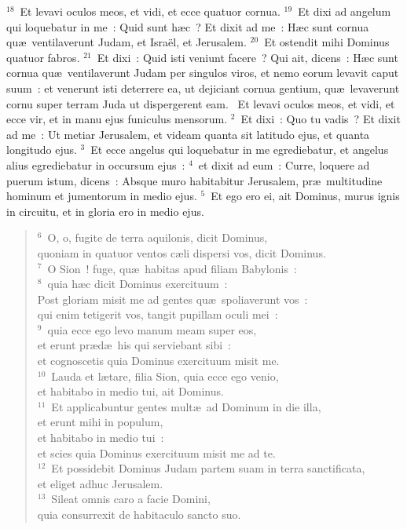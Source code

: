 ${}^{18}$~Et levavi oculos meos, et vidi, et ecce quatuor cornua.
${}^{19}$~Et dixi ad angelum qui loquebatur in me~: Quid sunt h\ae c~? Et dixit ad me~: H\ae c sunt cornua qu\ae\ ventilaverunt Judam, et Isra\"el, et Jerusalem.
${}^{20}$~Et ostendit mihi Dominus quatuor fabros.
${}^{21}$~Et dixi~: Quid isti veniunt facere~? Qui ait, dicens~: H\ae c sunt cornua qu\ae\ ventilaverunt Judam per singulos viros, et nemo eorum levavit caput suum~: et venerunt isti deterrere ea, ut dejiciant cornua gentium, qu\ae\ levaverunt cornu super terram Juda ut dispergerent eam.
~\lettrine[lines=10,image=true,loversize=0.05,lraise=-0.03]{E}{}t levavi oculos meos, et vidi, et ecce vir, et in manu ejus funiculus mensorum.
${}^{2}$~Et dixi~: Quo tu vadis~? Et dixit ad me~: Ut metiar Jerusalem, et videam quanta sit latitudo ejus, et quanta longitudo ejus.
${}^{3}$~Et ecce angelus qui loquebatur in me egrediebatur, et angelus alius egrediebatur in occursum ejus~:
${}^{4}$~et dixit ad eum~: Curre, loquere ad puerum istum, dicens~: Absque muro habitabitur Jerusalem, pr\ae\ multitudine hominum et jumentorum in medio ejus.
${}^{5}$~Et ego ero ei, ait Dominus, murus ignis in circuitu, et in gloria ero in medio ejus.
\begin{flushleft}\begin{verse}${}^{6}$~O, o, fugite de terra aquilonis, dicit Dominus,\\ quoniam in quatuor ventos c\ae li dispersi vos, dicit Dominus.\\
${}^{7}$~O Sion~! fuge, qu\ae\ habitas apud filiam Babylonis~:\\
${}^{8}$~quia h\ae c dicit Dominus exercituum~:\\ Post gloriam misit me ad gentes qu\ae\ spoliaverunt vos~:\\ qui enim tetigerit vos, tangit pupillam oculi mei~:\\
${}^{9}$~quia ecce ego levo manum meam super eos,\\ et erunt pr\ae d\ae\ his qui serviebant sibi~:\\ et cognoscetis quia Dominus exercituum misit me.\\
${}^{10}$~Lauda et l\ae tare, filia Sion, quia ecce ego venio,\\ et habitabo in medio tui, ait Dominus.\\
${}^{11}$~Et applicabuntur gentes mult\ae\ ad Dominum in die illa,\\ et erunt mihi in populum,\\ et habitabo in medio tui~:\\ et scies quia Dominus exercituum misit me ad te.\\
${}^{12}$~Et possidebit Dominus Judam partem suam in terra sanctificata,\\ et eliget adhuc Jerusalem.\\
${}^{13}$~Sileat omnis caro a facie Domini,\\ quia consurrexit de habitaculo sancto suo.\end{verse}\end{flushleft}


